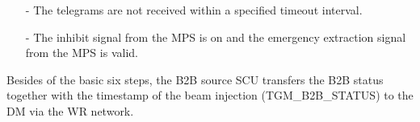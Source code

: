 \begin{enumerate}
\begin{itemize}
\item[-] The telegrams are not received within a specified timeout interval. 

\item[-] The inhibit signal from the MPS is on and the emergency extraction signal from the MPS is valid. 
\end{itemize}
Besides of the basic six steps, the B2B source SCU transfers the B2B status together with the timestamp of the beam injection (TGM\_B2B\_STATUS) to the DM via the WR network. 
\end{enumerate}


